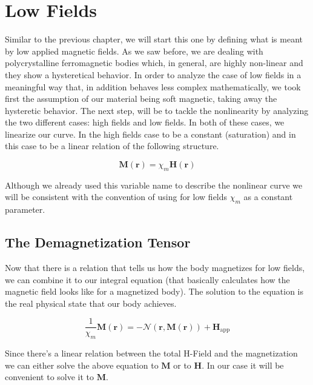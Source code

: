\section{Low Fields}

Similar to the previous chapter, we will start this one by defining what is meant by low applied magnetic fields. As we saw before, we are dealing with polycrystalline ferromagnetic bodies which, in general, are highly non-linear and they show a hysteretical behavior. In order to analyze the case of low fields in a meaningful way that, in addition behaves less complex mathematically, we took first the assumption of our material being soft magnetic, taking away the hysteretic behavior. The next step, will be to tackle the nonlinearity by analyzing the two different cases: high fields and low fields. In both of these cases, we linearize our curve. In the high fields case to be a constant (saturation) and in this case to be a linear relation of the following structure.

\begin{equation}
\textbf{M}(\textbf{r}) = \chi_m \textbf{H}(\textbf{r})
\end{equation}

Although we already used this variable name to describe the nonlinear curve we will be consistent with the convention of using for low fields $\chi_m$ as a constant parameter. 

\subsection{The Demagnetization Tensor}

Now that there is a relation that tells us how the body magnetizes for low fields, we can combine it to our integral equation (that basically calculates how the magnetic field looks like for a magnetized body). The solution to the equation is the real physical state that our body achieves.

\begin{equation}
\frac{1}{\chi_m}\textbf{M}(\textbf{r}) = -\mathcal{N}(\textbf{r},\textbf{M}(\textbf{r}))  + \textbf{H}_\text{app}
\end{equation}

Since there's a linear relation between the total H-Field and the magnetization we can either solve the above equation to $\textbf{M}$ or to $\textbf{H}$. In our case it will be convenient to solve it to $\textbf{M}$.\\


